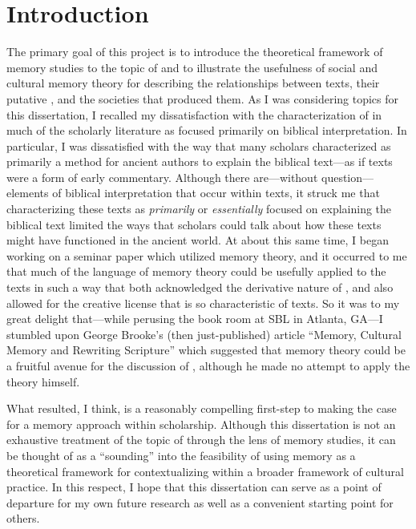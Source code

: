 
\chapter*{Introduction}

The primary goal of this project is to introduce the theoretical framework of memory studies to the topic of \rwb and to illustrate the usefulness of social and cultural memory theory for describing the relationships between \rwb texts, their putative \vorlagen, and the societies that produced them. As I was considering topics for this dissertation, I recalled my dissatisfaction with the characterization of \rwb in much of the scholarly literature as focused primarily on biblical interpretation. In particular, I was dissatisfied with the way that many scholars characterized \rwb as primarily a method for ancient authors to explain the biblical text---as if \rwb texts were a form of early commentary. Although there are---without question---elements of biblical interpretation that occur within \rwb texts, it struck me that characterizing these texts as \emph{primarily} or \emph{essentially} focused on explaining the biblical text limited the ways that scholars could talk about how these texts might have functioned in the ancient world. At about this same time, I began working on a seminar paper which utilized memory theory, and it occurred to me that much of the language of memory theory could be usefully applied to the \rwb texts in such a way that both acknowledged the derivative nature of \rwb, and also allowed for the creative license that is so characteristic of \rwb texts. So it was to my great delight that---while perusing the book room at SBL in Atlanta, GA---I stumbled upon George Brooke's (then just-published) article ``Memory, Cultural Memory and Rewriting Scripture'' which suggested that memory theory could be a fruitful avenue for the discussion of \rwb, although he made no attempt to apply the theory himself.%
    \autocite{brooke_zsengeller2014}

What resulted, I think, is a reasonably compelling first-step to making the case for a memory approach within \rwb scholarship. Although this dissertation is not an exhaustive treatment of the topic of \rwb through the lens of memory studies, it can be thought of as a ``sounding'' into the feasibility of using memory as a theoretical framework for contextualizing \rwb within a broader framework of cultural practice. In this respect, I hope that this dissertation can serve as a point of departure for my own future research as well as a convenient starting point for others. 

